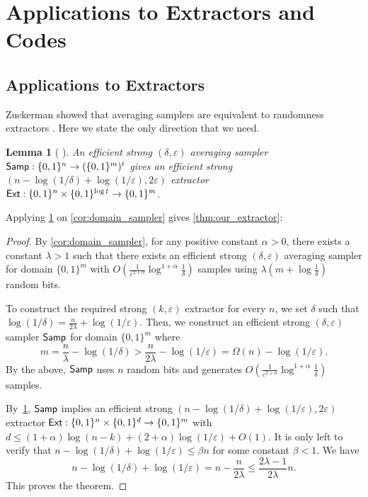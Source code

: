 \documentclass[11pt,letterpaper]{article}
\newtheorem{lemma}[theorem]{Lemma}
\newcommand{\eps}{\varepsilon}
\newcommand{\1}{\mathbbm{1}}
\newcommand{\zo}{\{0, 1\}}
\newcommand{\Ext}{\textup{\textsf{Ext}}}
\newcommand{\Smp}{\textup{\textsf{Samp}}}
\begin{document}
\section{Applications to Extractors and Codes}
\subsection{Applications to Extractors}

\label{sec:extractors}

Zuckerman showed that averaging samplers are equivalent to randomness extractors \cite{zuckerman1997randomness}. Here we state the only direction that we need.


\begin{lemma}[
\cite{zuckerman1997randomness}]
\label{lem:sampler_implies_extractor}
An efficient strong $(\delta, \eps)$ averaging sampler $\Smp : \zo^n \to (\zo^m)^t$ gives an efficient strong $ (n - \log (1 / \delta) + \log (1 / \eps), 2\eps)$ extractor $\Ext : \zo^n \times \zo^{\log t} \to \zo^m$.
\end{lemma}

Applying \cref{lem:sampler_implies_extractor} on \cref{cor:domain_sampler} gives  \cref{thm:our_extractor}:

\ourExtractor*
\begin{proof}
    By \cref{cor:domain_sampler}, for any positive constant $\alpha > 0$, there exists a constant $\lambda > 1$ such that there exists an efficient strong $(\delta, \eps)$ averaging sampler for domain $\zo^m$ with $O(\frac{1}{\eps^{2 + \alpha}} \log^{1 + \alpha} \frac{1}{\delta})$ samples using $\lambda(m + \log\frac{1}{\delta})$ random bits.

To construct the required strong $(k, \eps)$ extractor for every $n$, we set $\delta$ such that $\log(1 / \delta) = \frac{n}{2\lambda} + \log(1 / \eps)$.
Then, we construct an efficient strong $(\delta, \eps)$ sampler $\Smp$ for domain $\zo^m$ where \[
    m = \frac{n}{\lambda} - \log(1 / \delta) > \frac{n}{2\lambda} - \log(1 / \eps) = \Omega(n) - \log(1 / \eps).
\]
    By the above, $\Smp$ uses $n$ random bits and generates $O(\frac{1}{\eps^{2 + \alpha}} \log^{1 + \alpha} \frac{1}{\delta})$ samples.

By~\cref{lem:sampler_implies_extractor}, $\Smp$ implies an efficient strong $( n - \log(1 / \delta) + \log (1 / \eps), 2\eps)$ extractor $\Ext: \zo^n \times \zo^d \to \zo^m$ with $d \le (1 + \alpha)\log (n-k) + (2 + \alpha) \log (1 / \eps) + O(1)$.
It is only left to verify that $n - \log(1 / \delta) + \log(1 / \eps) \le \beta n$ for some constant $\beta < 1$. We have \[
 n - \log(1 / \delta) + \log (1 / \eps) =  n - \frac{n}{2\lambda}  \le \frac{2\lambda - 1}{2\lambda} n.
\]
This proves the theorem.
\end{proof}
\end{document}
